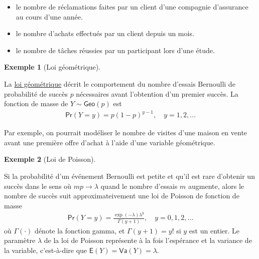 \documentclass[
  11pt,
  letterpaper,
]{scrbook}
\providecommand{\tightlist}{%
  \setlength{\itemsep}{0pt}\setlength{\parskip}{0pt}}\usepackage{longtable,booktabs,array}
\theoremstyle{definition}
\newtheorem{example}{Exemple}[chapter]
\theoremstyle{definition}
\theoremstyle{remark}
\begin{document}
\begin{itemize}
\tightlist
\item
  le nombre de réclamations faites par un client d'une compagnie
  d'assurance au cours d'une année.
\item
  le nombre d'achats effectués par un client depuis un mois.
\item
  le nombre de tâches réussies par un participant lors d'une étude.
\end{itemize}

\begin{example}[Loi
géométrique]\protect\hypertarget{exm-loigeom}{}\label{exm-loigeom}

La
\href{https://fr.wikipedia.org/wiki/Loi_g\%C3\%A9om\%C3\%A9trique}{loi
géométrique} décrit le comportement du nombre d'essais Bernoulli de
probabilité de succès \(p\) nécessaires avant l'obtention d'un premier
succès. La fonction de masse de \(Y \sim \mathsf{Geo}(p)\) est
\begin{align*}
\mathsf{Pr}(Y=y) = p (1-p)^{y-1}, \quad y=1,2, \ldots
\end{align*}

Par exemple, on pourrait modéliser le nombre de visites d'une maison en
vente avant une première offre d'achat à l'aide d'une variable
géométrique.

\end{example}

\begin{example}[Loi de
Poisson]\protect\hypertarget{exm-loipoisson}{}\label{exm-loipoisson}

Si la probabilité d'un événement Bernoulli est petite et qu'il est rare
d'obtenir un succès dans le sens où \(mp \to \lambda\) quand le nombre
d'essais \(m\) augmente, alors le nombre de succès suit
approximateivement une loi de Poisson de fonction de masse
\begin{align*}
\mathsf{Pr}(Y=y) = \frac{\exp(-\lambda)\lambda^y}{\Gamma(y+1)}, \quad y=0, 1, 2, \ldots
\end{align*} où \(\Gamma(\cdot)\) dénote la fonction gamma, et
\(\Gamma(y+1) = y!\) si \(y\) est un entier. Le paramètre \(\lambda\) de
la loi de Poisson représente à la fois l'espérance et la variance de la
variable, c'est-à-dire que \(\mathsf{E}(Y)=\mathsf{Va}(Y)=\lambda\).

\end{example}
\end{document}
